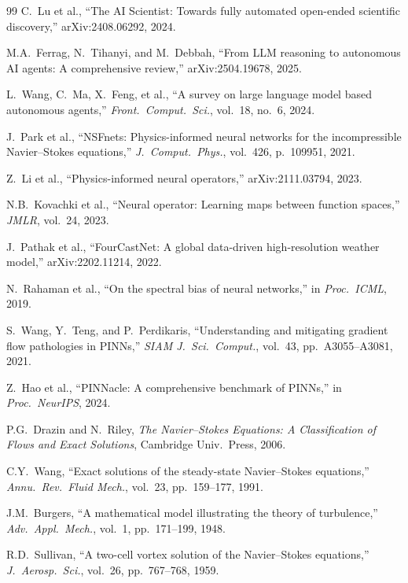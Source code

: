 \documentclass[conference]{IEEEtran}
\begin{document}
\begin{thebibliography}{99}
C.~Lu et al., ``The AI Scientist: Towards fully automated open-ended scientific discovery,'' arXiv:2408.06292, 2024.

M.A.~Ferrag, N.~Tihanyi, and M.~Debbah, ``From LLM reasoning to autonomous AI agents: A comprehensive review,'' arXiv:2504.19678, 2025.

L.~Wang, C.~Ma, X.~Feng, et al., ``A survey on large language model based autonomous agents,'' \emph{Front.\ Comput.\ Sci.}, vol.~18, no.~6, 2024.

J.~Park et al., ``NSFnets: Physics-informed neural networks for the incompressible Navier--Stokes equations,'' \emph{J.~Comput.\ Phys.}, vol.~426, p.~109951, 2021.

Z.~Li et al., ``Physics-informed neural operators,'' arXiv:2111.03794, 2023.

N.B.~Kovachki et al., ``Neural operator: Learning maps between function spaces,'' \emph{JMLR}, vol.~24, 2023.

J.~Pathak et al., ``FourCastNet: A global data-driven high-resolution weather model,'' arXiv:2202.11214, 2022.

N.~Rahaman et al., ``On the spectral bias of neural networks,'' in \emph{Proc.\ ICML}, 2019.

S.~Wang, Y.~Teng, and P.~Perdikaris, ``Understanding and mitigating gradient flow pathologies in PINNs,'' \emph{SIAM J.~Sci.\ Comput.}, vol.~43, pp.~A3055--A3081, 2021.

Z.~Hao et al., ``PINNacle: A comprehensive benchmark of PINNs,'' in \emph{Proc.\ NeurIPS}, 2024.

P.G.~Drazin and N.~Riley, \emph{The Navier--Stokes Equations: A Classification of Flows and Exact Solutions}, Cambridge Univ.\ Press, 2006.

C.Y.~Wang, ``Exact solutions of the steady-state Navier--Stokes equations,'' \emph{Annu.\ Rev.\ Fluid Mech.}, vol.~23, pp.~159--177, 1991.

J.M.~Burgers, ``A mathematical model illustrating the theory of turbulence,'' \emph{Adv.\ Appl.\ Mech.}, vol.~1, pp.~171--199, 1948.

R.D.~Sullivan, ``A two-cell vortex solution of the Navier--Stokes equations,'' \emph{J.\ Aerosp.\ Sci.}, vol.~26, pp.~767--768, 1959.


\end{thebibliography}
\end{document}
